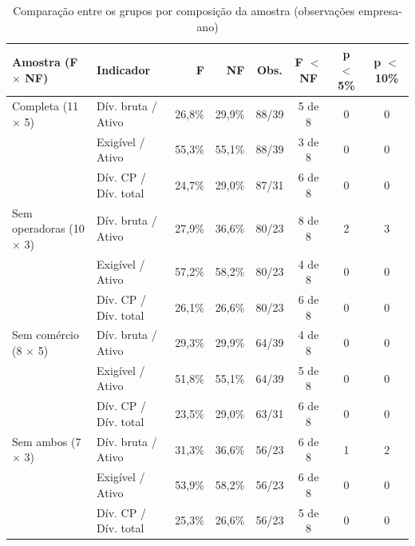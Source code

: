 \begin{table}[htb]
\caption{Comparação entre os grupos por composição da amostra (observações empresa-ano)}\label{tab:banca-amostras}
\centering\footnotesize\setlength{\tabcolsep}{4pt}
\begin{tabular}{llrrcccc}
\toprule
Amostra (F $\times$ NF) & Indicador & F & NF & Obs. & F $<$ NF & p $<$ 5\% & p $<$ 10\% \\
\midrule
Completa (11 $\times$ 5) & Dív. bruta / Ativo & 26,8\% & 29,9\% & 88/39 & 5 de 8 & 0 & 0 \\
 & Exigível / Ativo & 55,3\% & 55,1\% & 88/39 & 3 de 8 & 0 & 0 \\
 & Dív. CP / Dív. total & 24,7\% & 29,0\% & 87/31 & 6 de 8 & 0 & 0 \\
Sem operadoras (10 $\times$ 3) & Dív. bruta / Ativo & 27,9\% & 36,6\% & 80/23 & 8 de 8 & 2 & 3 \\
 & Exigível / Ativo & 57,2\% & 58,2\% & 80/23 & 4 de 8 & 0 & 0 \\
 & Dív. CP / Dív. total & 26,1\% & 26,6\% & 80/23 & 6 de 8 & 0 & 0 \\
Sem comércio (8 $\times$ 5) & Dív. bruta / Ativo & 29,3\% & 29,9\% & 64/39 & 4 de 8 & 0 & 0 \\
 & Exigível / Ativo & 51,8\% & 55,1\% & 64/39 & 5 de 8 & 0 & 0 \\
 & Dív. CP / Dív. total & 23,5\% & 29,0\% & 63/31 & 6 de 8 & 0 & 0 \\
Sem ambos (7 $\times$ 3) & Dív. bruta / Ativo & 31,3\% & 36,6\% & 56/23 & 6 de 8 & 1 & 2 \\
 & Exigível / Ativo & 53,9\% & 58,2\% & 56/23 & 6 de 8 & 0 & 0 \\
 & Dív. CP / Dív. total & 25,3\% & 26,6\% & 56/23 & 5 de 8 & 0 & 0 \\
\bottomrule
\end{tabular}
\end{table}
